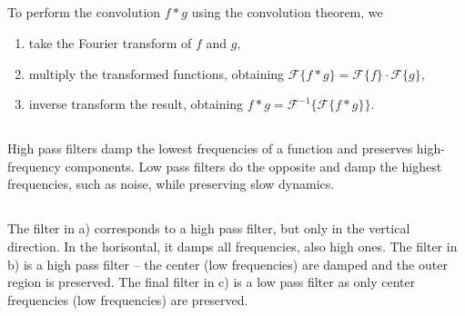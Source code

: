 \documentclass[]{article}
\begin{document}
\subsection{}
To perform the convolution $f * g$ using the convolution theorem, we
\begin{enumerate}
\item take the Fourier transform of $f$ and $g$,
\item multiply the transformed functions, obtaining $\mathcal{F}\{f*g\} = \mathcal{F}\{f\} \cdot \mathcal{F}\{g\}$,
\item inverse transform the result, obtaining $f * g = \mathcal{F}^{-1}\{\mathcal{F}\{f*g\}\}$.
\end{enumerate}

\subsection{}
High pass filters damp the lowest frequencies of a function and preserves high-frequency components. Low pass filters do the opposite and damp the highest frequencies, such as noise, while preserving slow dynamics.

\subsection{}
The filter in a) corresponds to a high pass filter, but only in the vertical direction. In the horisontal, it damps all frequencies, also high ones. The filter in b) is a high pass filter – the center (low frequencies) are damped and the outer region is preserved. The final filter in c) is a low pass filter as only center frequencies (low frequencies) are preserved.
\end{document}
